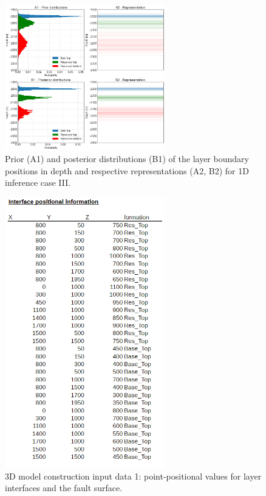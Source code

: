 \documentclass[a4paper,11pt]{MScThesis}
\begin{document}
	\begin{figure}[h]
		\centering
		\includegraphics[width=0.62\textwidth]{Figures/Appendix/update_smallres1}
		\caption{Prior (A1) and posterior distributions (B1) of the layer boundary positions in depth and respective representations (A2, B2) for 1D inference case III.}\label{fig:update_smallres1}
	\end{figure}

    \begin{figure}[h]
    	\centering
    	\includegraphics[width=0.62\textwidth]{Figures/Appendix/CSV_input1}
    	\caption{3D model construction input data 1: point-positional values for layer interfaces and the fault surface.}\label{fig:CSV_input1}
    \end{figure}
\end{document}
